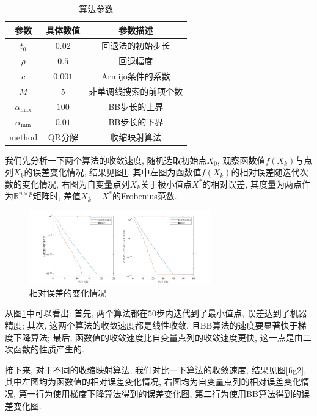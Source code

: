 \documentclass[UTF8]{ctexart}
\begin{document}
\begin{table}[htb]
    \centering
    \begin{tabular}{c|cc}
        \hline
        \hline
        参数 & 具体数值 & 参数描述\\
        \hline
        $t_0$ & $0.02$ & 回退法的初始步长\\
        $\rho$ & $0.5$ & 回退幅度\\
        $c$ & $0.001$ & Armijo条件的系数\\
        $M$ & $5$ & 非单调线搜索的前项个数\\
        $\alpha_{\max}$ & $100$ & BB步长的上界\\
        $\alpha_{\min}$ & $0.01$ & BB步长的下界\\
        method & QR分解 & 收缩映射算法\\
        \hline
        \hline
    \end{tabular}
    \caption{算法参数}\label{tab1}
\end{table}

我们先分析一下两个算法的收敛速度, 随机选取初始点$X_0$, 观察函数值$f(X_k)$与点列$X_k$的误差变化情况, 结果见图\ref{fig1}, 其中左图为函数值$f(X_k)$的相对误差随迭代次数的变化情况, 右图为自变量点列$X_k$关于极小值点$X^*$的相对误差, 其度量为两点作为$\mathbb{R}^{n\times p}$矩阵时, 差值$X_k-X^*$的Frobenius范数. 

\begin{figure}[htb]
    \centering
    \includegraphics[width=0.7\textwidth]{Q2-figure/1.png}
    \caption{相对误差的变化情况}\label{fig1}
\end{figure}

从图\ref{fig1}中可以看出: 首先, 两个算法都在$50$步内迭代到了最小值点, 误差达到了机器精度; 其次, 这两个算法的收敛速度都是线性收敛, 且BB算法的速度要显著快于梯度下降算法; 最后, 函数值的收敛速度比自变量点列的收敛速度更快, 这一点是由二次函数的性质产生的. 

接下来, 对于不同的收缩映射算法, 我们对比一下算法的收敛速度, 结果见图\ref{fig2}, 其中左图均为函数值的相对误差变化情况, 右图均为自变量点列的相对误差变化情况, 第一行为使用梯度下降算法得到的误差变化图, 第二行为使用BB算法得到的误差变化图. 
\end{document}

